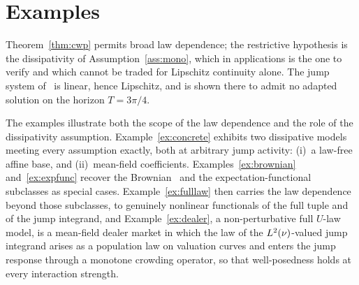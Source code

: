 \section{Examples}\label{sec:examples}

Theorem~\ref{thm:cwp} permits broad law dependence; the restrictive hypothesis is the
dissipativity of Assumption~\ref{ass:mono}, which in applications is the one to verify
and which cannot be traded for Lipschitz continuity alone. The jump system
of~\cite[Example~3.2]{LiMin} is linear, hence Lipschitz, and is shown there to admit no
adapted solution on the horizon $T=3\pi/4$.

The examples illustrate both the scope of the law dependence and the role of the
dissipativity assumption. Example~\ref{ex:concrete} exhibits two dissipative models
meeting every assumption exactly, both at arbitrary jump activity: (i)~a law-free affine base,
and (ii)~mean-field coefficients.
Examples~\ref{ex:brownian} and~\ref{ex:expfunc} recover the Brownian~\cite{BYZ} and the
expectation-functional~\cite{LiMin} subclasses as special cases.
Example~\ref{ex:fulllaw} then carries the law dependence beyond those subclasses, to genuinely
nonlinear functionals of the full tuple and of the jump integrand, and
Example~\ref{ex:dealer}, a non-perturbative full $U$-law model, is a
mean-field dealer market in which the law of the $L^2(\nu)$-valued jump integrand arises as a
population law on valuation curves and enters the jump response through a monotone
crowding operator, so that well-posedness holds at every interaction strength.

